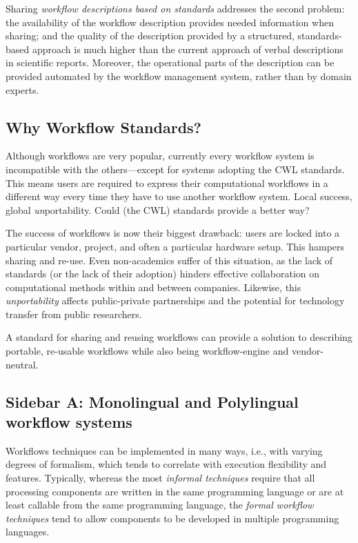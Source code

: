 \documentclass[sigconf,revew,screen,timestamp,nonacm]{acmart}
\begin{document}
Sharing \textit{workflow descriptions based on standards} addresses the second problem: the availability of the workflow description provides needed information when sharing; and the quality of the description provided by a structured, standards-based approach is much higher than the current approach of verbal descriptions in scientific reports. Moreover, the operational parts of the description can be provided automated by the workflow management system, rather than by domain experts.

\subsection{Why Workflow Standards?}\label{sec:bg:standard}

Although workflows are very popular, currently every workflow system is incompatible with the others---except for systems adopting the CWL standards. This means users are required to express their computational workflows in a different way every time they have to use another workflow system. Local success, global \textit{un}portability. Could (the CWL) standards provide a better way?

The success of workflows is now their biggest drawback: users are locked into a particular vendor, project, and often a particular hardware setup. This hampers sharing and re-use. Even non-academics suffer of this situation, as the lack of standards (or the lack of their adoption) hinders effective collaboration on computational methods within and between companies. Likewise, this \textit{unportability} affects public-private partnerships and the potential for technology transfer from public researchers.

A standard for sharing and reusing workflows can provide a solution to describing portable, re-usable workflows while also being workflow-engine and vendor-neutral.


\subsection{Sidebar A: Monolingual and Polylingual workflow systems} \label{sec:sidebar:a}

Workflows techniques can be implemented in many ways, i.e., with varying degrees of formalism, which tends to correlate with execution flexibility and features. Typically, whereas the most \textit{informal techniques} require that all processing components are written in the same programming language or are at least callable from the same programming language, the \textit{formal workflow techniques} tend to allow components to be developed in multiple programming languages. 
\end{document}
